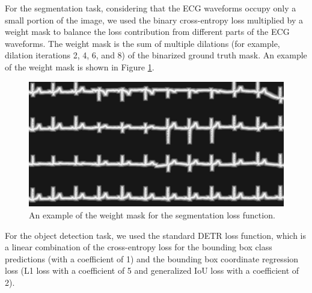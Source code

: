 For the segmentation task, considering that the ECG waveforms occupy only a small portion of the image, we used the binary cross-entropy loss multiplied by a weight mask to balance the loss contribution from different parts of the ECG waveforms. The weight mask is the sum of multiple dilations (for example, dilation iterations 2, 4, 6, and 8) of the binarized ground truth mask. An example of the weight mask is shown in Figure \ref{fig:weight-mask}.

\begin{figure}[!htp]
\centering
\includegraphics[width=0.85\linewidth]{images/weight-mask.pdf}
\caption{An example of the weight mask for the segmentation loss function.}
\label{fig:weight-mask}
\end{figure}

For the object detection task, we used the standard DETR loss function, which is a linear combination of the cross-entropy loss for the bounding box class predictions (with a coefficient of 1) and the bounding box coordinate regression loss (L1 loss with a coefficient of 5 and generalized IoU loss with a coefficient of 2).



